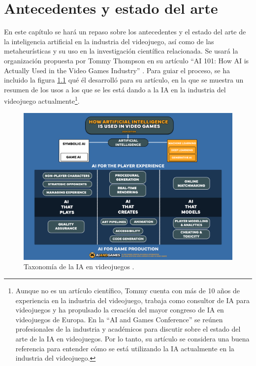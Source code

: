 \chapter{Antecedentes y estado del arte} \label{chap:antecedentes}

En este capítulo se hará un repaso sobre los antecedentes y el estado del arte de la inteligencia artificial en la industria del videojuego, así como de las metaheurísticas y su uso en la investigación científica relacionada. Se usará la organización propuesta por Tommy Thompson en su artículo ``AI 101: How AI is Actually Used in the Video Games Industry'' \cite{thompson_how_2025}. Para guiar el proceso, se ha incluido la figura \ref{fig:ia_taxonomia} qué él desarrolló para su artículo, en la que se muestra un resumen de los usos a los que se les está dando a la IA en la industria del videojuego actualmente\footnote{Aunque no es un artículo científico, Tommy cuenta con más de 10 años de experiencia en la industria del videojuego, trabaja como consultor de IA para videojuegos y ha propulsado la creación del mayor congreso de IA en videojuegos de Europa. En la ``AI and Games Conference'' se reúnen profesionales de la industria y académicos para discutir sobre el estado del arte de la IA en videojuegos. Por lo tanto, su artículo se considera una buena referencia para entender cómo se está utilizando la IA actualmente en la industria del videojuego.}.

\begin{figure}
	\centering
	\includegraphics[width=1.0\textwidth]{img/AIforGames-Taxonomy.png}
	\caption{Taxonomía de la IA en videojuegos \cite{thompson_how_2025}.}
	\label{fig:ia_taxonomia}
\end{figure}

